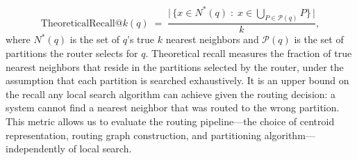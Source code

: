 \documentclass[sigconf,review,anonymous]{acmart}
\begin{document}
    \begin{equation}
    \mathrm{TheoreticalRecall}@k(q) \;=\; \frac{\bigl|\,\{x \in N^*(q) \;:\; x \in \bigcup_{P \in \mathcal{P}(q)} P\}\,\bigr|}{k},
    \label{eq:theoretical-recall}
    \end{equation}
    where $N^*(q)$ is the set of $q$'s true $k$ nearest neighbors and $\mathcal{P}(q)$ is the set of partitions the router selects for $q$.
    Theoretical recall measures the fraction of true nearest neighbors that reside in the partitions selected by the router, under the assumption that each partition is searched exhaustively. It is an upper bound on the recall any local search algorithm can achieve given the routing decision: a system cannot find a nearest neighbor that was routed to the wrong partition. This metric allows us to evaluate the routing pipeline---the choice of centroid representation, routing graph construction, and partitioning algorithm---independently of local search.

\end{document}
